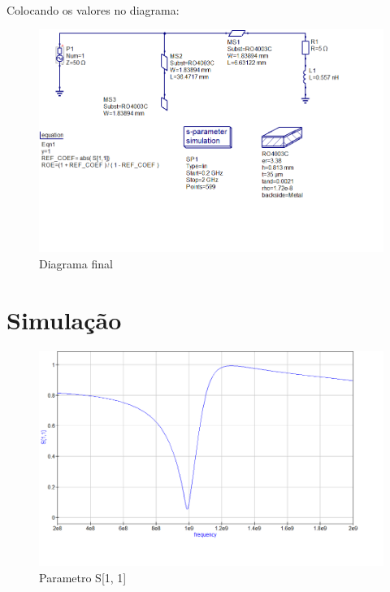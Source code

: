 \documentclass{article}
\begin{document}
\paragraph{} Colocando os valores no diagrama:

\begin{figure}[h!]
	\begin{center}
	\includegraphics[width=\linewidth]{images/diagrama_fin.png}
	\end{center}
	\caption{Diagrama final}
	\label{fig:imagem1}
\end{figure}

\section{Simulação}

\begin{figure}[h!]
	\begin{center}
	\includegraphics[width=\linewidth]{images/sim_resposta.png}
	\end{center}
	\caption{Parametro S[1, 1]}
	\label{fig:imagem1}
\end{figure}
\end{document}
